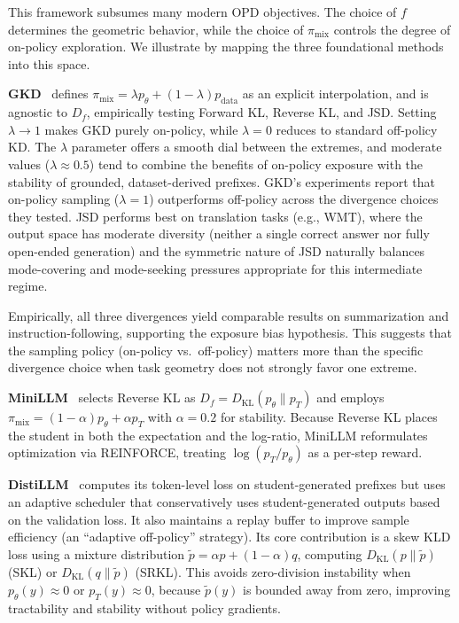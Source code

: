\documentclass{article} %
\newcommand{\KL}{D_{\mathrm{KL}}}
\newcommand{\ptheta}{p_\theta}
\newcommand{\pteacher}{p_T}
\newcommand{\pdata}{p_{\mathrm{data}}}
\begin{document}
This framework subsumes many modern OPD objectives. The choice of $f$ determines the geometric behavior, while the choice of $\pi_{\mathrm{mix}}$ controls the degree of on-policy exploration. We illustrate by mapping the three foundational methods into this space.

\textbf{GKD}~\citep{2306.13649} defines $\pi_{\mathrm{mix}} = \lambda \ptheta + (1-\lambda)\pdata$ as an explicit interpolation, and is agnostic to $D_f$, empirically testing Forward KL, Reverse KL, and JSD. Setting $\lambda \to 1$ makes GKD purely on-policy, while $\lambda = 0$ reduces to standard off-policy KD. The $\lambda$ parameter offers a smooth dial between the extremes, and moderate values ($\lambda \approx 0.5$) tend to combine the benefits of on-policy exposure with the stability of grounded, dataset-derived prefixes. GKD's experiments report that on-policy sampling ($\lambda = 1$) outperforms off-policy across the divergence choices they tested. JSD performs best on translation tasks (e.g., WMT), where the output space has moderate diversity (neither a single correct answer nor fully open-ended generation) and the symmetric nature of JSD naturally balances mode-covering and mode-seeking pressures appropriate for this intermediate regime.

Empirically, all three divergences yield comparable results on summarization and instruction-following, supporting the exposure bias hypothesis. This suggests that the sampling policy (on-policy vs.\ off-policy) matters more than the specific divergence choice when task geometry does not strongly favor one extreme.

\textbf{MiniLLM}~\citep{2306.08543} selects Reverse KL as $D_f = \KL(\ptheta \parallel \pteacher)$ and employs $\pi_{\mathrm{mix}} = (1-\alpha)\ptheta + \alpha\pteacher$ with $\alpha = 0.2$ for stability. Because Reverse KL places the student in both the expectation and the log-ratio, MiniLLM reformulates optimization via REINFORCE, treating $\log(\pteacher/\ptheta)$ as a per-step reward.

\textbf{DistiLLM}~\citep{2402.03898} computes its token-level loss on student-generated prefixes but uses an adaptive scheduler that conservatively uses student-generated outputs based on the validation loss. It also maintains a replay buffer to improve sample efficiency (an ``adaptive off-policy'' strategy). Its core contribution is a skew KLD loss using a mixture distribution $\tilde{p} = \alpha p + (1-\alpha)q$, computing $\KL(p \parallel \tilde{p})$ (SKL) or $\KL(q \parallel \tilde{p})$ (SRKL). This avoids zero-division instability when $\ptheta(y) \approx 0$ or $\pteacher(y) \approx 0$, because $\tilde{p}(y)$ is bounded away from zero, improving tractability and stability without policy gradients.
\end{document}
